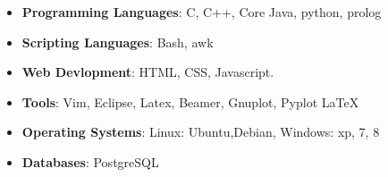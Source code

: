 \begin{multicols}{2}
\begin{itemize}
  \item \textbf{Programming Languages}: C, C++, Core Java, python, prolog\\[-0.6cm]
  \item \textbf{Scripting Languages}: Bash, awk  \\[-0.6cm]
  \item \textbf{Web Devlopment}: HTML, CSS, Javascript. 
 
\end{itemize}
\columnbreak
\begin{itemize}
  \item \textbf{Tools}: Vim, Eclipse, Latex, Beamer, Gnuplot, Pyplot \LaTeX \\[-0.6cm]
  \item \textbf{Operating Systems}: Linux: Ubuntu,Debian, Windows: xp, 7, 8\\[-0.6cm]
  \item \textbf{Databases}: PostgreSQL\\[-0.6cm]
\end{itemize}


\end{multicols}

